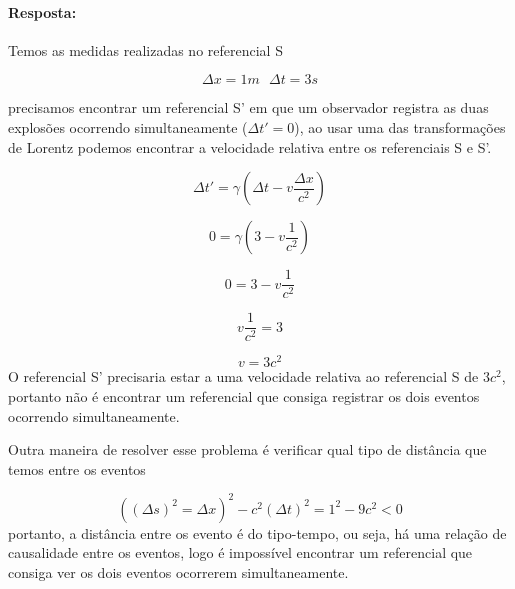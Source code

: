 \documentclass[10pt,a4paper]{article}
\begin{document}
	\paragraph{Resposta:}
	Temos as medidas realizadas no referencial S
	
	 $$\Delta x = 1 m \,\,\,\, \Delta t = 3s $$
	 
	 precisamos encontrar um referencial S' em que um observador registra as duas explosões ocorrendo simultaneamente ($ \Delta t' = 0 $), ao usar uma das transformações de Lorentz podemos encontrar a velocidade relativa entre os referenciais S e S'.
	 
	 $$ \Delta t' = \gamma \left( \Delta t - v \dfrac{\Delta x}{c^2}\right)$$

	 $$ 0 = \gamma \left( 3 - v \dfrac{1}{c^2}\right) $$
	 
	 $$ 0 =  3 - v \dfrac{1}{c^2} $$
	 
	 $$ v \dfrac{1}{c^2} = 3$$
	 
	 $$ v = 3c^2$$
	O referencial S' precisaria estar a uma velocidade relativa ao referencial S de $ 3c^2 $, portanto não é encontrar um referencial que consiga registrar os dois eventos ocorrendo simultaneamente.
	
	Outra maneira de resolver esse problema é verificar qual tipo de distância que temos entre os eventos
	
	$$( (\Delta s)^2 = \Delta x)^2 - c^2 (\Delta t)^2 = 1^2 -9c^2 < 0 $$
	portanto, a distância entre os evento é do tipo-tempo, ou seja, há uma relação de causalidade entre os eventos, logo é impossível encontrar um referencial que consiga ver os dois eventos ocorrerem simultaneamente.
	
	
	
	
\end{document}
